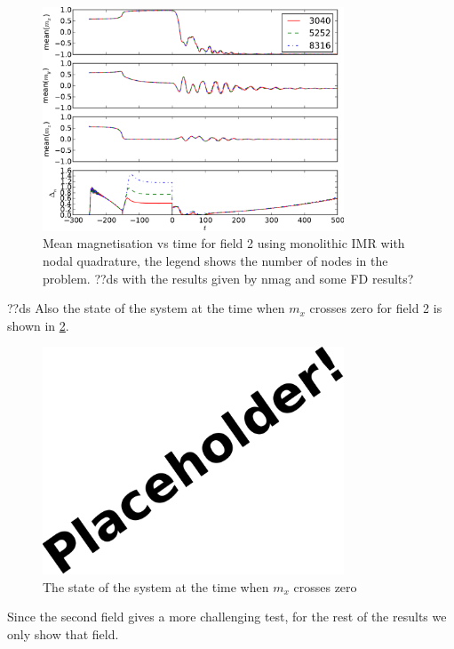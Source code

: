 \begin{figure}
  \centering
  \includegraphics[width=0.8\textwidth]{plots/mumag4_convergence/mumag4_field2-meanmxsvs-meanmysvs-meanmzsvs-dtsvstimes.pdf}
  \caption{Mean magnetisation vs time for field 2 using monolithic IMR with nodal quadrature, the legend shows the number of nodes in the problem.
    ??ds with the results given by nmag and some FD results?
  }
  \label{fig:nmag-comparison-mumag4-field2}
\end{figure}


??ds
Also the state of the system at the time when $m_x$ crosses zero for field 2 is shown in \cref{fig:mumag4-spatial-x-crossing-0}.

\begin{figure}
  \centering
  \includegraphics[width=0.8\textwidth]{images/placeholder}
  \caption{The state of the system at the time when $m_x$ crosses zero}
  \label{fig:mumag4-spatial-x-crossing-0}
\end{figure}


Since the second field gives a more challenging test, for the rest of the results we only show that field.

